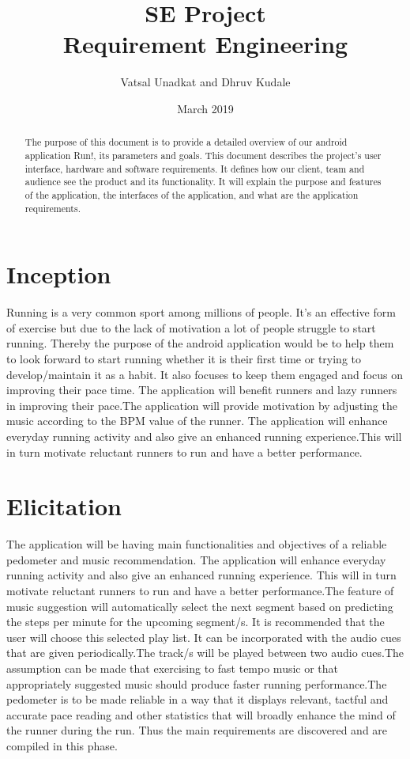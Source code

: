 \documentclass[10pt, a4paper]{article}
\title{SE Project \\ Requirement Engineering}
\author{Vatsal Unadkat and Dhruv Kudale}
\date{March 2019}
\begin{document}
\maketitle

\begin{abstract}
The purpose of this document is to provide a detailed overview of our android application Run!, its parameters and goals. This document describes the project's user interface, hardware and software requirements. It defines how our client, team and audience see the product and its functionality. It will explain the purpose and features of the application, the interfaces of the application, and what are the application requirements.
\end{abstract}

\section*{Inception}
Running is a very common sport among millions of people. It's an effective form of exercise but due to the lack of motivation a lot of people struggle to start running. 
Thereby the purpose of the android application would be to help them to look forward to start running whether it is their first time or trying to develop/maintain it as a habit. It also focuses to keep them engaged and focus on improving their pace time.
The application will benefit runners and lazy runners in improving their pace.The application will provide motivation by
adjusting the music according to the BPM value of the runner.
The application will enhance everyday running activity and also give an enhanced running experience.This will in turn motivate reluctant runners to run and have a better performance.


\section*{Elicitation}
The application will be having main functionalities and objectives of a reliable pedometer and music recommendation. The application will enhance everyday running activity and also give an enhanced running experience. This will in turn motivate reluctant runners to run and have a better performance.The feature of music suggestion will automatically select the next segment based on predicting the steps per minute for the upcoming segment/s. It is recommended that the user will choose this selected play list. It can be incorporated with the audio cues that are given periodically.The track/s will be played between two audio cues.The assumption can be made that exercising to fast tempo music or that appropriately suggested music should produce faster running performance.The pedometer is to be made reliable in a way that it displays relevant, tactful and accurate pace reading and other statistics that will broadly enhance the mind of the runner during the run. Thus the main requirements are discovered and are compiled in this phase.
\end{document}
